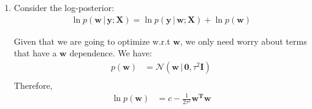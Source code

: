 \documentclass[submit]{harvardml}
\newcommand{\given}{\,|\,}
\renewcommand{\v}{\boldsymbol}
\begin{document}
\begin{enumerate}[label=(\alph*)]
	\item Consider the log-posterior:
		\begin{align*}
			\ln p(\v{w} \given \v{y}; \v{X}) = \ln p(\v{y} \given \v{w}; \v{X}) + \ln p(\v{w})
		\end{align*}
		
		Given that we are going to optimize w.r.t $\v{w}$, we only need worry about terms that have a $\v{w}$ dependence.
		We have:
	\begin{align*}
		p(\v{w}) &= \mathcal{N}(\v{w} \given \v{0}, \tau^{2} \v{I} ) \\
	\end{align*}
	Therefore, 
	\begin{align*}
		\ln p(\v{w}) &= c - \frac{1}{2\tau^2} \v{w^T w}
	\end{align*}
	

\end{enumerate}
\end{document}
